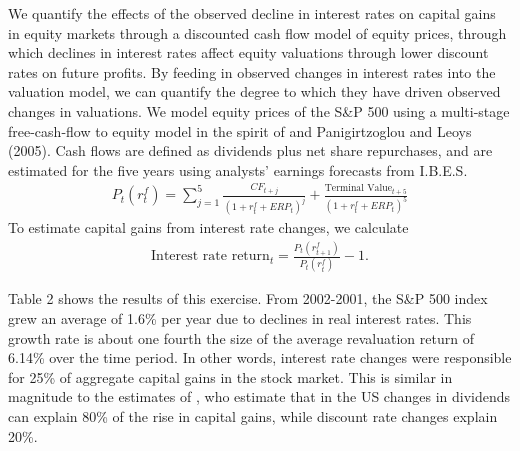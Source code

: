 \documentclass[12pt]{article}
\begin{document}
We  quantify the effects of the observed decline in interest rates on capital gains in equity markets through a discounted cash flow model of equity prices, through which declines in interest rates affect equity valuations through lower discount rates on future profits. By feeding in observed changes in interest rates into the valuation model, we can quantify the degree to which they have driven observed changes in valuations. We model equity prices of the S\&P 500 using a multi-stage free-cash-flow to equity model in the spirit of \citet{damodaran2020equity} and Panigirtzoglou and Leoys (2005). Cash flows are defined as dividends plus net share repurchases, and are estimated for the five years using analysts’ earnings forecasts from I.B.E.S. 
\begin{align}
P_t(r^f_t) = \sum_{j=1}^{5} \frac{CF_{t+j}}{(1 + r^f_{t} + ERP_{t})^{j}} + \frac{\text{Terminal Value}_{t+5}}{(1 + r^f_{t} + ERP_{t})^{5}}
\end{align}
To estimate capital gains from interest rate changes, we calculate
\begin{align}
\text{Interest rate return}_t = \frac{P_t(r^f_{t+1})}{P_t(r^f_t)} - 1.
\end{align}

Table 2 shows the results of this exercise. From 2002-2001, the S\&P 500 index grew an average of 1.6\% per year due to declines in real interest rates. This growth rate is about one fourth the size of the average revaluation return of 6.14\% over the time period. In other words, interest rate changes were responsible for 25\% of aggregate capital gains in the stock market. This is similar in magnitude to the estimates of \citet{eeckhout2024value}, who estimate that in the US changes in dividends can explain 80\% of the rise in capital gains, while discount rate changes explain 20\%. 
\end{document}
